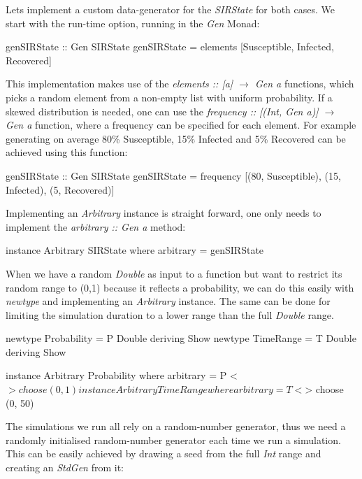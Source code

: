 Lets implement a custom data-generator for the \textit{SIRState} for both cases. We start with the run-time option, running in the \textit{Gen} Monad:

\begin{HaskellCode}
genSIRState :: Gen SIRState
genSIRState = elements [Susceptible, Infected, Recovered]
\end{HaskellCode}

This implementation makes use of the \textit{elements :: [a] $\rightarrow$ Gen a} functions, which picks a random element from a non-empty list with uniform probability. If a skewed distribution is needed, one can use the \textit{frequency :: [(Int, Gen a)] $\rightarrow$ Gen a} function, where a frequency can be specified for each element. For example generating on average 80\% Susceptible, 15\% Infected and 5\% Recovered can be achieved using this function:

\begin{HaskellCode}
genSIRState :: Gen SIRState
genSIRState = frequency [(80, Susceptible), (15, Infected), (5, Recovered)]
\end{HaskellCode}

Implementing an \textit{Arbitrary} instance is straight forward, one only needs to implement the \textit{arbitrary :: Gen a} method:

\begin{HaskellCode}
instance Arbitrary SIRState where
  arbitrary = genSIRState
\end{HaskellCode}

When we have a random \textit{Double} as input to a function but want to restrict its random range to (0,1) because it reflects a probability, we can do this easily with \textit{newtype} and implementing an \textit{Arbitrary} instance. The same can be done for limiting the simulation duration to a lower range than the full \textit{Double} range.

\begin{HaskellCode}
newtype Probability = P Double deriving Show
newtype TimeRange   = T Double deriving Show

instance Arbitrary Probability where
  arbitrary = P <$> choose (0, 1)
  
instance Arbitrary TimeRange where
  arbitrary = T <$> choose (0, 50)
\end{HaskellCode}

The simulations we run all rely on a random-number generator, thus we need a randomly initialised random-number generator each time we run a simulation. This can be easily achieved by drawing a seed from the full \textit{Int} range and creating an \textit{StdGen} from it:

